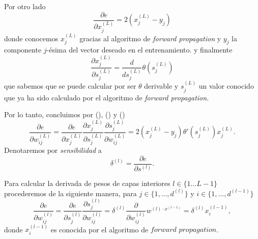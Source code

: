  Por otro lado 
 \begin{equation}\label{eq:backpropagation_E_última_capa_derivada}
    \frac{\partial{e}}{\partial x^{(L)}_j} =
    2 
    \left(
    x^{(L)}_j - y_j
    \right)
 \end{equation}
 donde conocemos $x^{(L)}_j$ gracias al algoritmo de \textit{forward propagation}
 y $y_j$ la componente $j$-ésima del vector deseado en el entrenamiento.
y finalmente
\begin{equation}\label{eq:backpropagation_x_última_capa_derivada}
    \frac{\partial x^{(L)}_j}{\partial s^{(L)}_j} 
    = 
    \frac{d}{d s^{(L)}_j} 
        \theta \left( 
            s^{(L)}_j
        \right)
\end{equation}
que sabemos que se puede calcular por ser $\theta$ derivable y 
$s^{(L)}_j$ un valor conocido que ya ha sido calculado por el algoritmo de 
\textit{forward propagation.}

Por lo tanto, concluimos por 
(),
()
y  
()
\begin{equation}
    \frac{\partial{e}}{\partial w^{(L)}_{i j}}
     = 
     \frac{\partial{e}}{\partial x^{(L)}_j} 
     \frac{\partial x^{(L)}_j}{\partial s^{(L)}_j} 
     \frac{\partial s^{(L)}_j}{\partial w^{(L)}_{i j}} 
    =
    2\left( x^{(L)}_j - y_j \right) 
    \theta' \left( s^{(L)}_j\right)
    x^{(L)}_j.
\end{equation}
Denotaremos por \textit{sensibilidad} a 
\begin{equation}
    \delta^{(l)} = \frac{\partial e}{ \partial s^{(l)}}.
\end{equation}

Para calcular la derivada de pesos de capas interiores 
$l \in \{1 \ldots L-1\}$
procederemos de la siguiente manera, para 
$j \in \{1, \ldots , d^{(l)}\}$ y 
$i \in \{1, \ldots , d^{(l-1)}\}$ 
\begin{equation}
    \frac{\partial{e}}{\partial w^{(l)}_{i j}}
     = 
     \frac{\partial e}{\partial s^{(l)}_j} 
     \frac{\partial s^{(l)}_j}{\partial w^{(l)}_{i j}}
    = 
    \delta^{(l)}
    \frac{\partial}{\partial w^{(l)}_{i j}}
    w^{(l) \cdot x^{(l-1)}}
    = 
    \delta^{(l)} x^{(l-1)}_i,
\end{equation}
donde  $x^{(l-1)}_i$ es conocida por el algoritmo de 
$\textit{forward propagation}$. 

